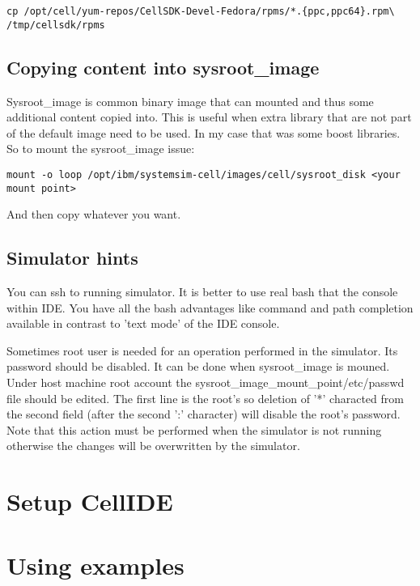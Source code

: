 \begin{verbatim}
cp /opt/cell/yum-repos/CellSDK-Devel-Fedora/rpms/*.{ppc,ppc64}.rpm\
/tmp/cellsdk/rpms
\end{verbatim}

\subsection{Copying content into sysroot\_image}

Sysroot\_image is common binary image that can mounted and thus some additional content copied into.
This is useful when extra library that are not part of the default image need to be used.
In my case that was some boost libraries. So to mount the sysroot\_image issue:
\begin{verbatim}
mount -o loop /opt/ibm/systemsim-cell/images/cell/sysroot_disk <your mount point>
\end{verbatim}
And then copy whatever you want.

\subsection{Simulator hints}

\par
You can ssh to running simulator. It is better to use real bash that the console within IDE.
You have all the bash advantages like command and path completion available in contrast to 'text mode' of the IDE console.

\par
Sometimes root user is needed for an operation performed in the simulator.
Its password should be disabled.
It can be done when sysroot\_image is mouned.
Under host machine root account the sysroot\_image\_mount\_point/etc/passwd file should be edited.
The first line is the root's so deletion of '*' characted from the second field (after the second ':' character) will disable the root's password.
Note that this action must be performed when the simulator is not running otherwise the changes will be overwritten by the simulator.

\section{Setup CellIDE}

\section{Using examples}

